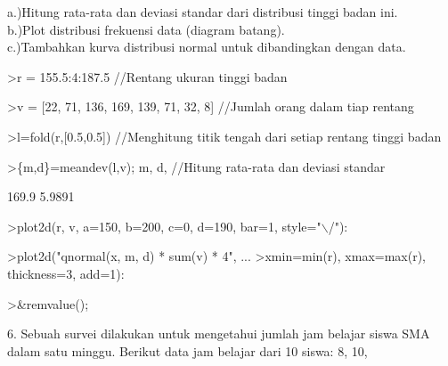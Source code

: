 \documentclass[a4paper,10pt]{article}
\begin{document}
\begin{eulernotebook}
\begin{eulercomment}
\begin{eulercomment}
\begin{eulercomment}
\begin{eulercomment}
\begin{eulercomment}
\begin{eulercomment}
\begin{eulercomment}
\begin{eulercomment}
\begin{eulercomment}
\begin{eulercomment}
\begin{eulercomment}
\begin{eulercomment}
\begin{eulercomment}
\begin{eulercomment}
\begin{eulercomment}
\begin{eulercomment}
\begin{eulercomment}
a.)Hitung rata-rata dan deviasi standar dari distribusi tinggi badan
ini.\\
b.)Plot distribusi frekuensi data (diagram batang).\\
c.)Tambahkan kurva distribusi normal untuk dibandingkan dengan data.
\end{eulercomment}
\begin{eulerprompt}
>r = 155.5:4:187.5  //Rentang ukuran tinggi badan
\end{eulerprompt}
\begin{euleroutput}
  [155.5,  159.5,  163.5,  167.5,  171.5,  175.5,  179.5,  183.5,  187.5]
\end{euleroutput}
\begin{eulerprompt}
>v = [22, 71, 136, 169, 139, 71, 32, 8] //Jumlah orang dalam tiap rentang
\end{eulerprompt}
\begin{euleroutput}
  [22,  71,  136,  169,  139,  71,  32,  8]
\end{euleroutput}
\begin{eulerprompt}
>l=fold(r,[0.5,0.5])  //Menghitung titik tengah dari setiap rentang tinggi badan
\end{eulerprompt}
\begin{euleroutput}
  [157.5,  161.5,  165.5,  169.5,  173.5,  177.5,  181.5,  185.5]
\end{euleroutput}
\begin{eulerprompt}
>\{m,d\}=meandev(l,v); m, d,  //Hitung rata-rata dan deviasi standar
\end{eulerprompt}
\begin{euleroutput}
  169.9
  5.9891
\end{euleroutput}
\begin{eulerprompt}
>plot2d(r, v, a=150, b=200, c=0, d=190, bar=1, style="\(\backslash\)/"):
\end{eulerprompt}
\begin{eulerprompt}
>plot2d("qnormal(x, m, d) * sum(v) * 4", ...
>xmin=min(r), xmax=max(r), thickness=3, add=1):
\end{eulerprompt}
\begin{eulerprompt}
>&remvalue();
\end{eulerprompt}
\begin{eulercomment}
6. Sebuah survei dilakukan untuk mengetahui jumlah jam belajar siswa
SMA dalam satu minggu. Berikut data jam belajar dari 10 siswa: 8, 10,

\end{eulercomment}
\end{eulercomment}
\end{eulercomment}
\end{eulercomment}
\end{eulercomment}
\end{eulercomment}
\end{eulercomment}
\end{eulercomment}
\end{eulercomment}
\end{eulercomment}
\end{eulercomment}
\end{eulercomment}
\end{eulercomment}
\end{eulercomment}
\end{eulercomment}
\end{eulercomment}
\end{eulercomment}
\end{eulernotebook}
\end{document}

